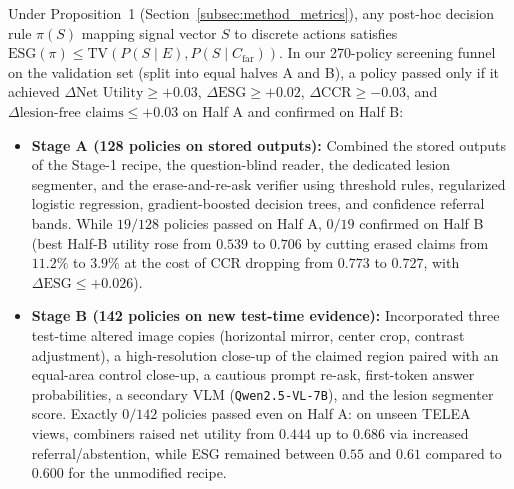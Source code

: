\documentclass[10pt]{article}
\begin{document}
Under Proposition~1 (Section~\ref{subsec:method_metrics}), any post-hoc decision rule $\pi(S)$ mapping signal vector $S$ to discrete actions satisfies $\text{ESG}(\pi) \le \text{TV}(P(S \mid E), P(S \mid C_{\text{far}}))$. In our 270-policy screening funnel on the validation set (split into equal halves A and B), a policy passed only if it achieved $\Delta\text{Net Utility} \ge +0.03$, $\Delta\text{ESG} \ge +0.02$, $\Delta\text{CCR} \ge -0.03$, and $\Delta\text{lesion-free claims} \le +0.03$ on Half A and confirmed on Half B:
\begin{itemize}[leftmargin=*,nosep]
    \item \textbf{Stage A (128 policies on stored outputs):} Combined the stored outputs of the Stage-1 recipe, the question-blind reader, the dedicated lesion segmenter, and the erase-and-re-ask verifier using threshold rules, regularized logistic regression, gradient-boosted decision trees, and confidence referral bands. While $19/128$ policies passed on Half A, $0/19$ confirmed on Half B (best Half-B utility rose from $0.539$ to $0.706$ by cutting erased claims from $11.2\%$ to $3.9\%$ at the cost of CCR dropping from $0.773$ to $0.727$, with $\Delta\text{ESG} \le +0.026$).
    \item \textbf{Stage B (142 policies on new test-time evidence):} Incorporated three test-time altered image copies (horizontal mirror, center crop, contrast adjustment), a high-resolution close-up of the claimed region paired with an equal-area control close-up, a cautious prompt re-ask, first-token answer probabilities, a secondary VLM (\texttt{Qwen2.5-VL-7B}), and the lesion segmenter score. Exactly $0/142$ policies passed even on Half A: on unseen TELEA views, combiners raised net utility from $0.444$ up to $0.686$ via increased referral/abstention, while ESG remained between $0.55$ and $0.61$ compared to $0.600$ for the unmodified recipe.
\end{itemize}
\end{document}
